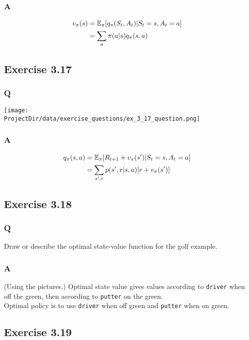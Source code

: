 \subsubsection{A}
\begin{align*}
    v_\pi(s) & = \mathbb{E}_\pi[q_\pi(S_t, A_t) |S_t = s, A_t = a] \\ 
          & = \sum_a \pi(a|s) q_\pi(s, a)
\end{align*}

\subsection{Exercise 3.17}
\subsubsection{Q}
\texttt{[image: \\ProjectDir/data/exercise\_questions/ex\_3\_17\_question.png]}
 
\subsubsection{A} 
\begin{align*}
    q_\pi(s, a) & = \mathbb{E}_\pi[R_{t+1} + v_\pi(s') |S_t = s, A_t = a] \\ 
          & = \sum_{s', r} p(s', r|s, a) [r + v_\pi(s')]
\end{align*}


\subsection{Exercise 3.18}
\subsubsection{Q}
Draw or describe the optimal state-value function for the golf example.

\subsubsection{A}
(Using the pictures.) Optimal state value gives values according to \texttt{driver} when off the green, then according to \texttt{putter} on the green.\\

Optimal policy is to use \texttt{driver} when off green and \texttt{putter} when on green.
 
 
\subsection{Exercise 3.19}
